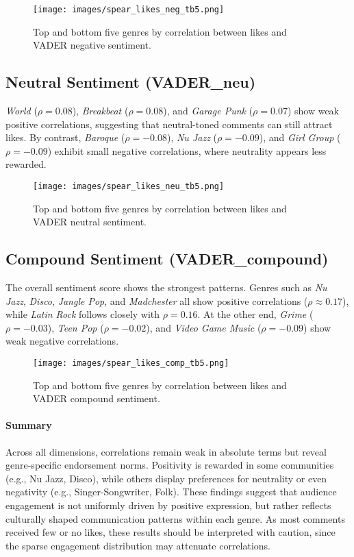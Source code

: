 \begin{figure}[htbp]
    \centering
    \texttt{[image: images/spear\_likes\_neg\_tb5.png]}
    \caption{Top and bottom five genres by correlation between likes and VADER negative sentiment.}
    \label{fig:spear_likes_neg}
\end{figure}
\FloatBarrier

\subsection*{Neutral Sentiment (VADER\_neu)}
\textit{World} ($\rho = 0.08$), \textit{Breakbeat} ($\rho = 0.08$), and \textit{Garage Punk} 
($\rho = 0.07$) show weak positive correlations, suggesting that neutral-toned comments 
can still attract likes. By contrast, \textit{Baroque} ($\rho = -0.08$), 
\textit{Nu Jazz} ($\rho = -0.09$), and \textit{Girl Group} ($\rho = -0.09$) 
exhibit small negative correlations, where neutrality appears less rewarded.

\begin{figure}[htbp]
    \centering
    \texttt{[image: images/spear\_likes\_neu\_tb5.png]}
    \caption{Top and bottom five genres by correlation between likes and VADER neutral sentiment.}
    \label{fig:spear_likes_neu}
\end{figure}
\FloatBarrier

\subsection*{Compound Sentiment (VADER\_compound)}
The overall sentiment score shows the strongest patterns. Genres such as 
\textit{Nu Jazz}, \textit{Disco}, \textit{Jangle Pop}, and \textit{Madchester} 
all show positive correlations ($\rho \approx 0.17$), while \textit{Latin Rock} 
follows closely with $\rho = 0.16$. At the other end, \textit{Grime} ($\rho = -0.03$), 
\textit{Teen Pop} ($\rho = -0.02$), and \textit{Video Game Music} ($\rho = -0.09$) 
show weak negative correlations.

\begin{figure}[htbp]
    \centering
    \texttt{[image: images/spear\_likes\_comp\_tb5.png]}
    \caption{Top and bottom five genres by correlation between likes and VADER compound sentiment.}
    \label{fig:spear_likes_comp}
\end{figure}
\FloatBarrier

\paragraph{Summary}
Across all dimensions, correlations remain weak in absolute terms but reveal 
genre-specific endorsement norms. Positivity is rewarded in some communities 
(e.g., Nu Jazz, Disco), while others display preferences for neutrality or 
even negativity (e.g., Singer-Songwriter, Folk). These findings suggest that 
audience engagement is not uniformly driven by positive expression, but rather 
reflects culturally shaped communication patterns within each genre. As most 
comments received few or no likes, these results should be interpreted with 
caution, since the sparse engagement distribution may attenuate correlations.



